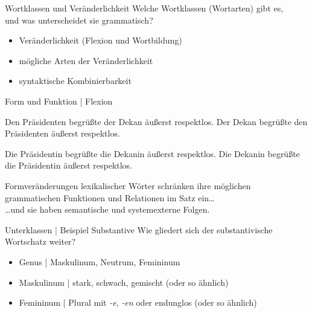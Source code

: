 \begin{frame}
  {Wortklassen und Veränderlichkeit}
  \onslide<+->
  \onslide<+->
  Welche Wortklassen (Wortarten) gibt es,\\
  und was unterscheidet sie \alert{grammatisch}?\\
  \onslide<+->
  \onslide<+->
  \Zeile
  \begin{itemize}[<+->]
    \item Veränderlichkeit (Flexion und Wortbildung)
    \item mögliche Arten der Veränderlichkeit
    \item syntaktische Kombinierbarkeit
  \end{itemize}
\end{frame}

\begin{frame}
  {Form und Funktion | Flexion}
  \onslide<+->
  \onslide<+->
  \begin{exe}
    \ex
    \begin{xlist}
      \ex \alert{Den Präsidenten} begrüßte \alert{der Dekan} äußerst respektlos.
       \onslide<+->
      \ex \alert{Der Dekan} begrüßte \alert{den Präsidenten} äußerst respektlos.
    \end{xlist}
    \onslide<+->
    \ex
    \begin{xlist}
      \ex \alert{Die Präsidentin} begrüßte \alert{die Dekanin} äußerst respektlos.
      \onslide<+->
      \ex \alert{Die Dekanin} begrüßte \alert{die Präsidentin} äußerst respektlos.
    \end{xlist}
  \end{exe}
  \onslide<+->
  \Zeile
  Formveränderungen lexikalischer Wörter \alert{schränken ihre möglichen grammatischen Funktionen und Relationen im Satz ein}\dots\\
  \onslide<+->
  \Halbzeile
  \dots und sie haben semantische und systemexterne Folgen.
\end{frame}

\begin{frame}
  {Unterklassen | Beispiel Substantive}
  \onslide<+->
  \onslide<+->
  Wie gliedert sich der substantivische Wortschatz weiter?
  \onslide<+->
  \onslide<+->
  \Zeile
  \begin{itemize}[<+->]
    \item \alert{Genus} | Maskulinum, Neutrum, Femininum
    \item Maskulinum | \alert{stark}, \alert{schwach}, \alert{gemischt} (oder so ähnlich)
    \item Femininum | Plural mit \alert{\textit{-e}}, \alert{\textit{-en}} oder \alert{endunglos} (oder so ähnlich) 
  \end{itemize}
\end{frame}


